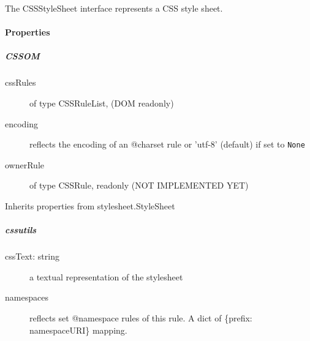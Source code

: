 The CSSStyleSheet interface represents a CSS style sheet.



\hypertarget{properties}{}
\paragraph*{Properties}
\label{properties}



\hypertarget{cssom}{}
\subparagraph*{CSSOM}
\label{cssom}
\begin{description}
\item[{cssRules}] \leavevmode 
of type CSSRuleList, (DOM readonly)

\item[{encoding}] \leavevmode 
reflects the encoding of an @charset rule or 'utf-8' (default)
if set to \texttt{None}

\item[{ownerRule}] \leavevmode 
of type CSSRule, readonly (NOT IMPLEMENTED YET)

\end{description}

Inherits properties from stylesheet.StyleSheet



\hypertarget{cssutils}{}
\subparagraph*{cssutils}
\label{cssutils}
\begin{description}
\item[{cssText: string}] \leavevmode 
a textual representation of the stylesheet

\item[{namespaces}] \leavevmode 
reflects set @namespace rules of this rule.
A dict of {\{}prefix: namespaceURI{\}} mapping.

\end{description}



\hypertarget{format}{}
